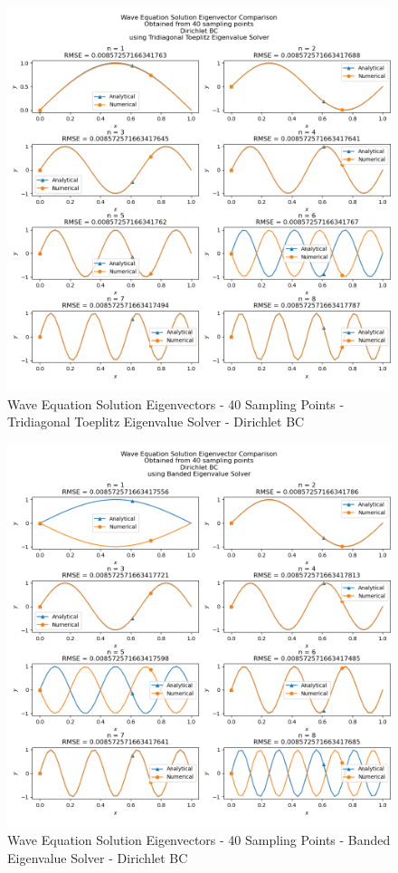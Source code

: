 \documentclass[letterpaper,12pt]{article}
\begin{document}
\begin{figure}[H]
\centerline{\includegraphics[width=\linewidth]{figures/2_40_Tridiagonal_Toeplitz_Eigenvalue_Solver_d_eigenvector.png}}
\caption{Wave Equation Solution Eigenvectors - 40 Sampling Points - Tridiagonal Toeplitz Eigenvalue Solver - Dirichlet BC}
\label{fig:2_40_Tridiagonal_Toeplitz_Eigenvalue_Solver_d_eigenvector}
\end{figure}
    
\begin{figure}[H]
\centerline{\includegraphics[width=\linewidth]{figures/2_40_Banded_Eigenvalue_Solver_d_eigenvector.png}}
\caption{Wave Equation Solution Eigenvectors - 40 Sampling Points - Banded Eigenvalue Solver - Dirichlet BC}
\label{fig:2_40_Banded_Eigenvalue_Solver_d_eigenvector}
\end{figure}
\end{document}
